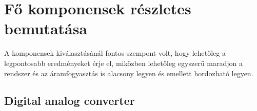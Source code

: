 \section{Fő komponensek részletes bemutatása}

A komponensek kiválasztásánál fontos szempont volt, hogy lehetőleg a legpontosabb 
eredményeket érje el, miközben lehetőleg egyszerű maradjon a rendszer és az áramfogyasztás 
is alacsony legyen és emellett hordozható legyen.

\subsection{Digital analog converter}
